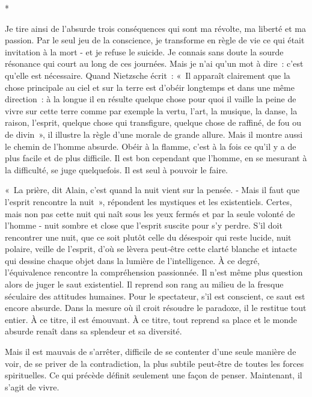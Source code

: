 \documentclass{book}
\begin{document}
\begin{center}
*
\end{center}

Je tire ainsi de l'absurde trois conséquences qui sont ma révolte, ma liberté et ma passion. Par le seul jeu de la conscience, je transforme en règle de vie ce qui était invitation à la mort - et je refuse le suicide. Je connais sans doute la sourde résonance qui court au long de ces journées. Mais je n'ai qu'un mot à dire : c'est qu'elle est nécessaire. Quand Nietzsche écrit : « Il apparaît clairement que la chose principale au ciel et sur la terre est d'obéir longtemps et dans une même direction : à la longue il en résulte quelque chose pour quoi il vaille la peine de vivre sur cette terre comme par exemple la vertu, l'art, la musique, la danse, la raison, l'esprit, quelque chose qui transfigure, quelque chose de raffiné, de fou ou de divin », il illustre la règle d'une morale de grande allure. Mais il montre aussi le chemin de l'homme absurde. Obéir à la flamme, c'est à la fois ce qu'il y a de plus facile et de plus difficile. Il est bon cependant que l'homme, en se mesurant à la difficulté, se juge quelquefois. Il est seul à pouvoir le faire.

« La prière, dit Alain, c'est quand la nuit vient sur la pensée. ‑ Mais il faut que l'esprit rencontre la nuit », répondent les mystiques et les existentiels. Certes, mais non pas cette nuit qui naît sous les yeux fermés et par la seule volonté de l'homme - nuit sombre et close que l'esprit suscite pour s'y perdre. S'il doit rencontrer une nuit, que ce soit plutôt celle du désespoir qui reste lucide, nuit polaire, veille de l'esprit, d'où se lèvera peut‑être cette clarté blanche et intacte qui dessine chaque objet dans la lumière de l'intelligence. À ce degré, l'équivalence rencontre la compréhension passionnée. Il n'est même plus question alors de juger le saut existentiel. Il reprend son rang au milieu de la fresque séculaire des attitudes humaines. Pour le spectateur, s'il est conscient, ce saut est encore absurde. Dans la mesure où il croit résoudre le paradoxe, il le restitue tout entier. À ce titre, il est émouvant. À ce titre, tout reprend sa place et le monde absurde renaît dans sa splendeur et sa diversité.

Mais il est mauvais de s'arrêter, difficile de se contenter d'une seule manière de voir, de se priver de la contradiction, la plus subtile peut-être de toutes les forces spirituelles. Ce qui précède définit seulement une façon de penser. Maintenant, il s'agit de vivre.
\end{document}
